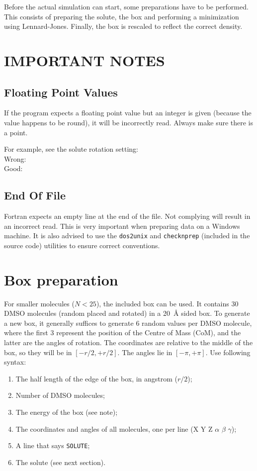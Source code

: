 Before the actual simulation can start, some preparations have to be performed.
This consists of preparing the solute, the box and performing a minimization 
using Lennard-Jones. Finally, the box is rescaled to reflect the correct 
density.

\section{IMPORTANT NOTES}
\subsection{Floating Point Values}
If the program expects a floating point value but an integer is given (because 
the value happens to be round), it will be incorrectly read. Always make sure 
there is a point.

For example, see the solute rotation setting:\\
Wrong: \vispace{} \vispace\vispace{}  \\
Good: \vispace{} \vispace\vispace{} 

\subsection{End Of File}
Fortran expects an empty line at the end of the file. Not complying will result 
in an incorrect read. This is very important when preparing data on a Windows 
machine. It is also advised to use the \verb|dos2unix| and \verb|checknprep| 
(included in the source code) utilities to ensure correct conventions.

\section{Box preparation}
For smaller molecules ($N < 25$), the included box can be used. It contains 30 
DMSO molecules (random placed and rotated) in a \SI{20}{\angstrom} sided box.
To generate a new box, it generally suffices to generate 6 random values per 
DMSO molecule, where the first 3 represent the position of the Centre of Mass 
(CoM), and the latter are the angles of rotation. The coordinates are relative 
to the middle of the box, so they will be in $[-r/2, +r/2]$. The angles lie in 
$[-\pi, +\pi]$. Use following syntax:

\begin{enumerate}
	\item The half length of the edge of the box, in angstrom ($r/2$);
	\item Number of DMSO molecules;
	\item The energy of the box (see note);
	\item The coordinates and angles of all molecules, one per line (X Y Z 
	$\alpha$ $\beta$ $\gamma$);
	\item A line that says \verb|SOLUTE|;
	\item The solute (see next section).
\end{enumerate}

